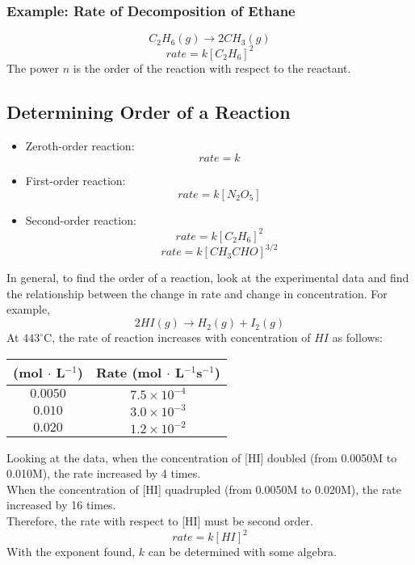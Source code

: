 \documentclass[10pt]{article}
\begin{document}
\subsubsection*{Example: Rate of Decomposition of Ethane}
\[C_2 H_6(g) \rightarrow 2CH_3(g)\]
\[rate = k[C_2H_6]^2\]
The power $n$ is the order of the reaction with respect to the reactant.

\subsection*{Determining Order of a Reaction}
\begin{itemize}
    \item Zeroth-order reaction:
    \[rate = k\]
    \item First-order reaction:
    \[rate = k[N_2O_5]\]
    \item Second-order reaction:
    \[rate = k[C_2H_6]^2\]
    \[rate = k[CH_3CHO]^{3/2}\]
\end{itemize}
In general, to find the order of a reaction, look at the experimental data and find the relationship between the change in rate and change in concentration.  For example,
\[2 HI(g) \rightarrow H_2(g) + I_2(g)\]
At $443^\circ$C, the rate of reaction increases with concentration of $HI$ as follows:\\
\begin{center}
\begin{tabular}{|c|c|}
    \hline
    [HI] (mol $\cdot$ L$^{-1}$) & Rate (mol $\cdot$ L$^{-1}$s$^{-1}$) \\
    \hline
    $0.0050$ & $7.5 \times 10^{-4}$ \\
    \hline
    $0.010$ & $3.0 \times 10^{-3}$ \\
    \hline
    $0.020$ & $1.2 \times 10^{-2}$ \\
    \hline
\end{tabular}
\end{center}
Looking at the data, when the concentration of [HI] doubled (from 0.0050M to 0.010M), the rate increased by 4 times.\\
When the concentration of [HI] quadrupled (from 0.0050M to 0.020M), the rate increased by 16 times.\\
Therefore, the rate with respect to [HI] must be second order.
\[rate = k[HI]^2\]
With the exponent found, $k$ can be determined with some algebra.
\end{document}
